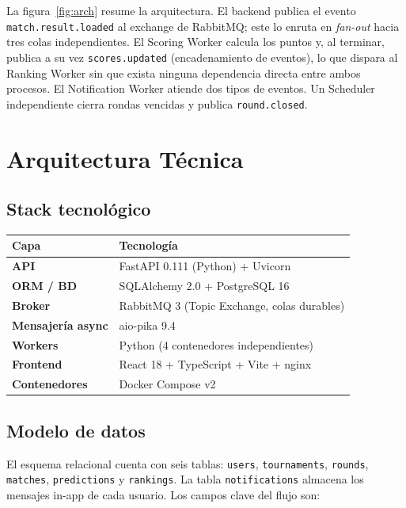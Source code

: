 \documentclass[12pt, a4paper]{article}
\begin{document}
La figura~\ref{fig:arch} resume la arquitectura. El backend publica el evento \texttt{match.result.loaded} al exchange de RabbitMQ; este lo enruta en \textit{fan-out} hacia tres colas independientes. El Scoring Worker calcula los puntos y, al terminar, publica a su vez \texttt{scores.updated} (encadenamiento de eventos), lo que dispara al Ranking Worker sin que exista ninguna dependencia directa entre ambos procesos. El Notification Worker atiende dos tipos de eventos. Un Scheduler independiente cierra rondas vencidas y publica \texttt{round.closed}.

\section{Arquitectura Técnica}

\subsection{Stack tecnológico}

\begin{center}
\begin{tabular}{>{\bfseries}ll}
\toprule
Capa & Tecnología \\
\midrule
API & FastAPI 0.111 (Python) + Uvicorn \\
ORM / BD & SQLAlchemy 2.0 + PostgreSQL 16 \\
Broker & RabbitMQ 3 (Topic Exchange, colas durables) \\
Mensajería async & aio-pika 9.4 \\
Workers & Python (4 contenedores independientes) \\
Frontend & React 18 + TypeScript + Vite + nginx \\
Contenedores & Docker Compose v2 \\
\bottomrule
\end{tabular}
\end{center}

\subsection{Modelo de datos}

El esquema relacional cuenta con seis tablas: \texttt{users}, \texttt{tournaments}, \texttt{rounds}, \texttt{matches}, \texttt{predictions} y \texttt{rankings}. La tabla \texttt{notifications} almacena los mensajes in-app de cada usuario. Los campos clave del flujo son:
\end{document}
